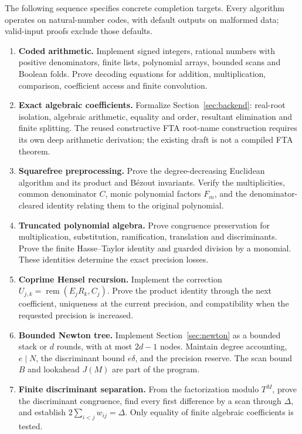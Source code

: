 The following sequence specifies concrete completion targets.  Every
algorithm operates on natural-number codes, with default outputs on
malformed data; valid-input proofs exclude those defaults.

\begin{enumerate}
\setlength{\itemsep}{3pt}
\item \textbf{Coded arithmetic.}
Implement signed integers, rational numbers with positive denominators,
finite lists, polynomial arrays, bounded scans and Boolean folds.
Prove decoding equations for addition, multiplication, comparison,
coefficient access and finite convolution.

\item \textbf{Exact algebraic coefficients.}
Formalize Section~\ref{sec:backend}: real-root isolation, algebraic
arithmetic, equality and order, resultant elimination and finite splitting.
The reused constructive FTA root-name construction requires its own
deep arithmetic derivation; the existing draft is not a compiled
FTA theorem.

\item \textbf{Squarefree preprocessing.}
Prove the degree-decreasing Euclidean algorithm and its product and
B\'ezout invariants.  Verify the multiplicities, common denominator \(C\),
monic polynomial factors \(F_m\), and the denominator-cleared identity
relating them to the original polynomial.

\item \textbf{Truncated polynomial algebra.}
Prove congruence preservation for multiplication, substitution,
ramification, translation and discriminants.  Prove the finite
Hasse--Taylor identity and guarded division by a monomial.
These identities determine the exact precision losses.

\item \textbf{Coprime Hensel recursion.}
Implement the correction
\(U_{j,k}=\operatorname{rem}(E_jR_k,C_j)\).
Prove the product identity through the next coefficient, uniqueness
at the current precision, and compatibility when the requested
precision is increased.

\item \textbf{Bounded Newton tree.}
Implement Section~\ref{sec:newton} as a bounded stack or \(d\) rounds,
with at most \(2d-1\) nodes.  Maintain degree accounting,
\(e\mid N\), the discriminant bound \(e\delta\), and the precision reserve.
The scan bound \(B\) and lookahead \(J(M)\) are part of the program.

\item \textbf{Finite discriminant separation.}
From the factorization modulo \(T^M\), prove the discriminant congruence,
find every first difference by a scan through \(\Delta\), and establish
\(2\sum_{i<j}w_{ij}=\Delta\).
Only equality of finite algebraic coefficients is tested.


\end{enumerate}
